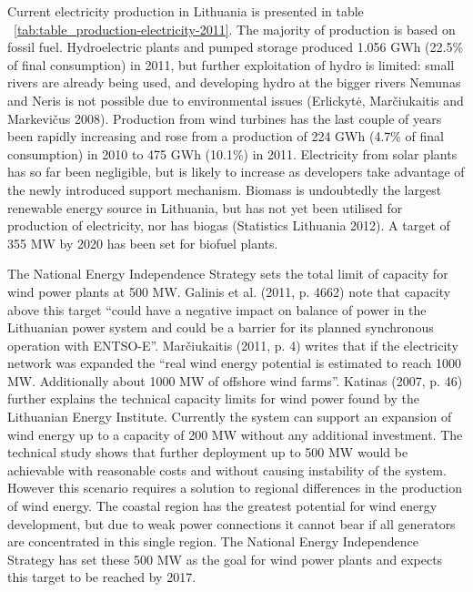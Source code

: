 \documentclass[a4paper, 12pt]{article}
\begin{document}

Current electricity production in Lithuania is presented in table ~\ref{tab:table_production-electricity-2011}. The majority of production is based on fossil fuel. Hydroelectric plants and pumped storage produced 1.056 GWh (22.5\% of final consumption) in 2011, but further exploitation of hydro is limited: small rivers are already being used, and developing hydro at the bigger rivers Nemunas and Neris is not possible due to environmental issues (Erlickytė, Marčiukaitis and Markevičus 2008). Production from wind turbines has the last couple of years been rapidly increasing and rose from a production of 224 GWh (4.7\% of final consumption) in 2010 to 475 GWh (10.1\%) in 2011. Electricity from solar plants has so far been negligible, but is likely to increase as developers take advantage of the newly introduced support mechanism. Biomass is undoubtedly the largest renewable energy source in Lithuania, but has not yet been utilised for production of electricity, nor has biogas (Statistics Lithuania 2012). A target of 355 MW by 2020 has been set for biofuel plants. 

The National Energy Independence Strategy sets the total limit of capacity for wind power plants at 500 MW. Galinis et al. (2011, p. 4662) note that capacity above this target ``could have a negative impact on balance of power in the Lithuanian power system and could be a barrier for its planned synchronous operation with ENTSO-E''. Marčiukaitis (2011, p. 4) writes that if the electricity network was expanded the ``real wind energy potential is estimated to reach 1000 MW. Additionally about 1000 MW of offshore wind farms''. Katinas (2007, p. 46) further explains the technical capacity limits for wind power found by the Lithuanian Energy Institute. Currently the system can support an expansion of wind energy up to a capacity of 200 MW without any additional investment. The technical study shows that further deployment up to 500 MW would be achievable with reasonable costs and without causing instability of the system. However this scenario requires a solution to regional differences in the production of wind energy. The coastal region has the greatest potential for wind energy development, but due to weak power connections it cannot bear if all generators are concentrated in this single region. The National Energy Independence Strategy has set these 500 MW as the goal for wind power plants and expects this target to be reached by 2017. 
\end{document}
